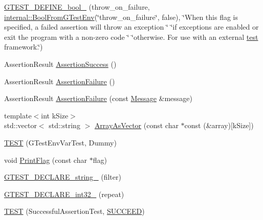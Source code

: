 \begin{DoxyCompactItemize}
\item 
\mbox{\hyperlink{namespacetesting_a2850b20fc3080527fae82aa170ef9aa5}{G\+T\+E\+S\+T\+\_\+\+D\+E\+F\+I\+N\+E\+\_\+bool\+\_\+}} (throw\+\_\+on\+\_\+failure, \mbox{\hyperlink{namespacetesting_1_1internal_a67132cdce23fb71b6c38ee34ef81eb4c}{internal\+::\+Bool\+From\+G\+Test\+Env}}(\char`\"{}throw\+\_\+on\+\_\+failure\char`\"{}, false), \char`\"{}When this flag is specified, a failed assertion will throw an exception \char`\"{} \char`\"{}if exceptions are enabled or exit the program with a non-\/zero code \char`\"{} \char`\"{}otherwise. For use with an external \mbox{\hyperlink{_mutual_8h_a707ee03719e99670bf6cfdfd897b8456}{test}} framework.\char`\"{})
\item 
Assertion\+Result \mbox{\hyperlink{namespacetesting_ac1d0baedb17286c5c6c87bd1a45da8ac}{Assertion\+Success}} ()
\item 
Assertion\+Result \mbox{\hyperlink{namespacetesting_a75cb789614cb1c28c34627a4a3c053df}{Assertion\+Failure}} ()
\item 
Assertion\+Result \mbox{\hyperlink{namespacetesting_a56f59110a218942d2fc4695914b1685c}{Assertion\+Failure}} (const \mbox{\hyperlink{classtesting_1_1_message}{Message}} \&message)
\item 
{\footnotesize template$<$int k\+Size$>$ }\\std\+::vector$<$ std\+::string $>$ \mbox{\hyperlink{namespacetesting_ab25cc403881367e4ae289dab4eb37f5d}{Array\+As\+Vector}} (const char $\ast$const (\&array)\mbox{[}k\+Size\mbox{]})
\item 
\mbox{\hyperlink{namespacetesting_af4187d1b48a2812f1335721ed8f30a99}{T\+E\+ST}} (G\+Test\+Env\+Var\+Test, Dummy)
\item 
void \mbox{\hyperlink{namespacetesting_a9863402455bfcf9be5fc0b1453a6d97d}{Print\+Flag}} (const char $\ast$flag)
\item 
\mbox{\hyperlink{namespacetesting_a20d69860ce843142c7f740262e6b0c9a}{G\+T\+E\+S\+T\+\_\+\+D\+E\+C\+L\+A\+R\+E\+\_\+string\+\_\+}} (filter)
\item 
\mbox{\hyperlink{namespacetesting_a315ef0647e4f2795bf1705de8e9c9659}{G\+T\+E\+S\+T\+\_\+\+D\+E\+C\+L\+A\+R\+E\+\_\+int32\+\_\+}} (repeat)
\item 
\mbox{\hyperlink{namespacetesting_ae0cbea692840c88ab0b03285eb69ac97}{T\+E\+ST}} (Successful\+Assertion\+Test, \mbox{\hyperlink{_obj__test_2lib_2googletest-release-1_88_81_2googletest_2include_2gtest_2gtest_8h_a75adcdf89f69b0b615e395daafc315af}{S\+U\+C\+C\+E\+ED}})
\item 

\end{DoxyCompactItemize}
